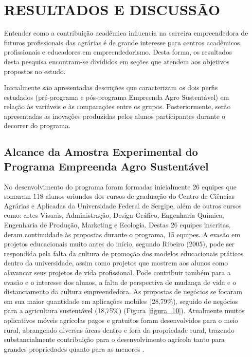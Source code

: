 \chapter{RESULTADOS E DISCUSSÃO}

Entender como a contribuição acadêmica influencia na carreira empreendedora de futuros profissionais das agrárias é de grande interesse para centros acadêmicos, profissionais e educadores em empreendedorismo. Desta forma, os resultados desta pesquisa encontram-se divididos em seções que atendem aos objetivos propostos no estudo.

Inicialmente são apresentadas descrições que caracterizam os dois perfis estudados (pré-programa e pós-programa Empreenda Agro Sustentável) em relação às variáveis e às comparações entre os grupos. Posteriormente, serão apresentadas as inovações produzidas pelos alunos participantes durante o decorrer do programa.


\section{Alcance da Amostra Experimental do Programa Empreenda Agro Sustentável}

No desenvolvimento do programa foram formadas inicialmente 26 equipes que somaram 118 alunos oriundos dos cursos de graduação do Centro de Ciências Agrárias e Aplicadas da Universidade Federal de Sergipe, além de outros cursos como: artes Visuais, Administração, Design Gráfico, Engenharia Química, Engenharia de Produção, Marketing e Ecologia. Destas 26 equipes inscritas, deram continuidade às propostas durante o programa, 15 equipes. A evasão em projetos educacionais muito antes do início, segundo Ribeiro (2005), pode ser respondida pela falta da cultura de promoção dos modelos educacionais práticos dentro da universidade, assim como projetos que mostrem aos alunos como alavancar seus projetos de vida profissional. Pode contribuir também para a evasão e o interesse dos alunos, a falta de perspectiva de mudança de vida e o distanciamento da cultura empreendedora.
As propostas de negócios se focaram em sua maior quantidade em aplicações mobiles (28,79\%), seguido de negócios para a agricultura sustentável (18,75\%) (Figura \ref{figura_10}). Atualmente muitos aplicativos móveis agrícolas pagos e gratuitos foram desenvolvidos para o meio rural, abrangendo diversas áreas dentro e fora da propriedade rural, trazendo substancialmente contribuição para o desenvolvimento agrícola tanto para grandes propriedades quanto para as menores \cite{silva_caracterizacao_2017}. 
 
